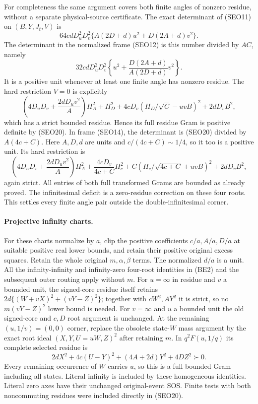 For completeness the same argument covers both finite angles of
nonzero residue, without a separate physical-source certificate.
The exact determinant of (SEO11) on $(B,Y,J_t,V)$ is
\[
 64cdD_u^2D_v^2
 \{A(2D+d)u^2+D(2A+d)v^2\}.                    \tag{SEO20}
\]
The determinant in the normalized frame (SEO12) is this number
divided by $AC$, namely
\[
 32cdD_u^2D_v^2
 \left\{u^2+\frac{D(2A+d)}{A(2D+d)}v^2\right\}.
\]
It is a positive unit whenever at least one finite angle has
nonzero residue. The hard restriction $V=0$ is explicitly
\[
 \left(4D_uD_v+\frac{2dD_uv^2}{A}\right)H_A^2
 +H_D^2+4cD_v(H_D/\sqrt C-uvB)^2+2dD_vB^2,
\]
which has a strict bounded residue. Hence its full residue Gram
is positive definite by (SEO20). In frame (SEO14), the determinant
is (SEO20) divided by $A(4c+C)$. Here $A,D,d$ are units and
$c/(4c+C)\sim1/4$, so it too is a positive unit. Its hard
restriction is
\[
 \left(4D_uD_v+\frac{2dD_uv^2}{A}\right)H_A^2
 +\frac{4cD_v}{4c+C}H_c^2
 +C(H_c/\sqrt{4c+C}+uvB)^2+2dD_vB^2,
\]
again strict. All entries of both full transformed Grams are
bounded as already proved. The infinitesimal deficit is a
zero-residue correction on these four roots. This settles every
finite angle pair outside the double-infinitesimal corner.

\paragraph{Projective infinity charts.}
For these charts normalize by $a$, clip the positive coefficients
$c/a,A/a,D/a$ at suitable positive real lower bounds, and retain
their positive original excess squares. Retain the whole original
$m,\alpha,\beta$ terms. The normalized $d/a$ is a unit.
All the infinity-infinity and infinity-zero four-root identities
in (BE2) and the subsequent outer routing apply without $m$.
For $u=\infty$ in residue and $v$ a bounded unit, the signed-core
residue itself retains
$2d\{(W+vX)^2+(vY-Z)^2\}$; together with $cW^2,AY^2$ it is
strict, so no $m(vY-Z)^2$ lower bound is needed.
For $v=\infty$ and $u$ a bounded unit the old signed-core and
$c,D$ root argument is unchanged.
At the remaining $(u,1/v)=(0,0)$ corner, replace the obsolete
state-$W$ mass argument by the exact root ideal
$(X,Y,U=uW,Z)^2$ after retaining $m$. In $q^2F(u,1/q)$ its
complete selected residue is
\[
 2dX^2+4c(U-Y)^2+(4A+2d)Y^2+4DZ^2\succ0.
 \tag{SEO19}
\]
Every remaining occurrence of $W$ carries $u$, so this is a full
bounded Gram including all states. Literal infinity is included
by these homogeneous identities. Literal zero axes have their
unchanged original-event SOS. Finite tests with both noncommuting
residues were included directly in (SEO20).

